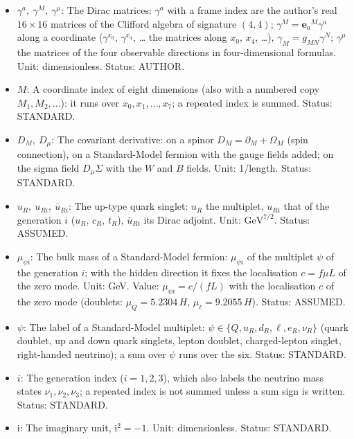 \documentclass[
  10pt,
]{article}
\providecommand{\tightlist}{%
  \setlength{\itemsep}{0pt}\setlength{\parskip}{0pt}}
\begin{document}
\begin{itemize}
\tightlist
\item
  \(\gamma^a,\ \gamma^M,\ \gamma^\mu\): The Dirac matrices: \(\gamma^a\)
  with a frame index are the author's real \(16 \times 16\) matrices of
  the Clifford algebra of signature \((4, 4)\);
  \(\gamma^M = \mathbf{e}_a{}^M\gamma^a\) along a coordinate
  (\(\gamma^{x_0}\), \(\gamma^{x_4}\), \ldots{} the matrices along
  \(x_0\), \(x_4\), \ldots), \(\gamma_M = g_{MN}\gamma^N\);
  \(\gamma^\mu\) the matrices of the four observable directions in
  four-dimensional formulas. Unit: dimensionless. Status: AUTHOR.
\item
  \(M\): A coordinate index of eight dimensions (also with a numbered
  copy \(M_1, M_2, \dots\)): it runs over \(x_0, x_1, \dots, x_7\); a
  repeated index is summed. Status: STANDARD.
\item
  \(D_M,\ D_\mu\): The covariant derivative: on a spinor
  \(D_M = \partial_M + \Omega_M\) (spin connection), on a Standard-Model
  fermion with the gauge fields added; on the sigma field
  \(D_\mu\Sigma\) with the \(W\) and \(B\) fields. Unit: 1/length.
  Status: STANDARD.
\item
  \(u_R,\ u_{Ri},\ \bar u_{Ri}\): The up-type quark singlet: \(u_R\) the
  multiplet, \(u_{Ri}\) that of the generation \(i\) (\(u_R\), \(c_R\),
  \(t_R\)), \(\bar u_{Ri}\) its Dirac adjoint. Unit:
  \(\mathrm{GeV}^{7/2}\). Status: ASSUMED.
\item
  \(\mu_{\psi i}\): The bulk mass of a Standard-Model fermion:
  \(\mu_{\psi i}\) of the multiplet \(\psi\) of the generation \(i\);
  with the hidden direction it fixes the localisation \(c = f\mu L\) of
  the zero mode. Unit: GeV. Value: \(\mu_{\psi i} = c/(fL)\) with the
  localisation \(c\) of the zero mode (doublets: \(\mu_Q = 5.2304\,H\),
  \(\mu_\ell = 9.2055\,H\)). Status: ASSUMED.
\item
  \(\psi\): The label of a Standard-Model multiplet:
  \(\psi \in \{Q, u_R, d_R, \ell, e_R, \nu_R\}\) (quark doublet, up and
  down quark singlets, lepton doublet, charged-lepton singlet,
  right-handed neutrino); a sum over \(\psi\) runs over the six. Status:
  STANDARD.
\item
  \(i\): The generation index (\(i = 1, 2, 3\)), which also labels the
  neutrino mass states \(\nu_1, \nu_2, \nu_3\); a repeated index is not
  summed unless a sum sign is written. Status: STANDARD.
\item
  \(\mathrm{i}\): The imaginary unit, \(\mathrm{i}^2 = -1\). Unit:
  dimensionless. Status: STANDARD.

\end{itemize}
\end{document}
